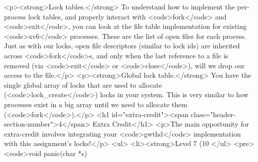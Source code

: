 \documentclass[]{}
\begin{document}
<p><strong>Lock tables.</strong> To understand how to implement the per-process lock tables, and properly interact with <code>fork</code> and <code>exit</code>, you can look at the file table implementation for existing <code>xv6</code> processes. These are the list of open files for each process. Just as with our locks, open file descriptors (similar to lock ids) are inherited across <code>fork</code>s, and only when the last reference to a file is removed (via <code>exit</code> or <code>close</code>), will we drop our access to the file.</p>
<p><strong>Global lock table.</strong> You have the single global array of locks that are used to allocate (<code>lock_create</code>) locks in your system. This is very similar to how processes exist in a big array until we need to allocate them (<code>fork</code>).</p>
<h1 id="extra-credit"><span class="header-section-number">4</span> Extra Credit</h1>
<p>The main opportunity for extra-credit involves integrating your <code>gwthd</code> implementation with this assignment's locks!</p>
<ul>
<li><strong>Level 7 (10%
</ul>
<pre><code>void
panic(char *s)
\end{document}
